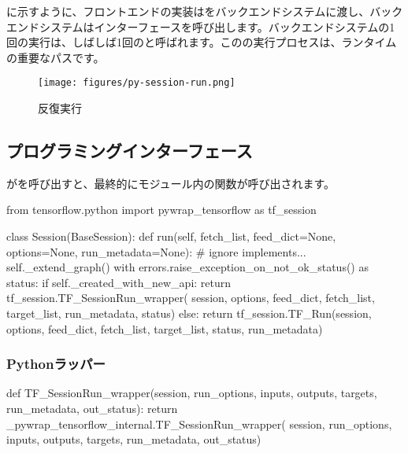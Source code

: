\begin{content}

に示すように、フロントエンドの実装はをバックエンドシステムに渡し、バックエンドシステムはインターフェースを呼び出します。バックエンドシステムの1回の実行は、しばしば1回のと呼ばれます。このの実行プロセスは、ランタイムの重要なパスです。

\begin{figure}[H]
\centering
\texttt{[image: figures/py-session-run.png]}
\caption{反復実行}
 \label{fig:py-session-run}
\end{figure}

\subsection{プログラミングインターフェース}

がを呼び出すと、最終的にモジュール内の関数が呼び出されます。

\begin{leftbar}
\begin{python}[caption={tensorflow/python/client/session.py}]
from tensorflow.python import pywrap_tensorflow as tf_session

class Session(BaseSession):
  def run(self, fetch_list, feed_dict=None, options=None, run_metadata=None):
    # ignore implements...
    self._extend_graph()
    with errors.raise_exception_on_not_ok_status() as status:
      if self._created_with_new_api:
        return tf_session.TF_SessionRun_wrapper(
            session, options, feed_dict, fetch_list, target_list,
            run_metadata, status)
      else:
        return tf_session.TF_Run(session, options,
                                 feed_dict, fetch_list, target_list,
                                 status, run_metadata)
\end{python}
\end{leftbar}


\subsubsection{Pythonラッパー}

\begin{leftbar}
\begin{python}[caption={tensorflow/bazel-bin/tensorflow/python/pywrap\_tensorflow\_internal.py}]
def TF_SessionRun_wrapper(session, run_options, inputs, 
  outputs, targets, run_metadata, out_status):
  return _pywrap_tensorflow_internal.TF_SessionRun_wrapper(
    session, run_options, inputs, outputs, targets, run_metadata, out_status)


\end{python}
\end{leftbar}
\end{content}
